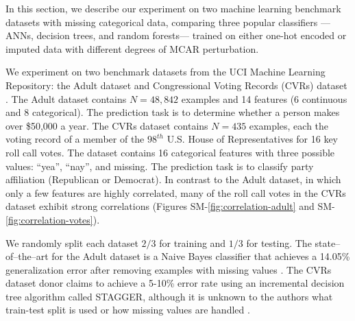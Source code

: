 \documentclass[10pt]{book}
\theoremstyle{definition}
\begin{document}
\par


\setcounter{chapter}{3}
\setcounter{equation}{0} %

In this section, we describe our experiment on two machine learning benchmark datasets with missing categorical data, comparing three popular classifiers --- ANNs, decision trees, and random forests--- trained on either one-hot encoded or imputed data with different degrees of MCAR perturbation.

\par
{}

We experiment on two benchmark datasets from the UCI Machine Learning Repository: the Adult dataset and Congressional Voting Records (CVRs) dataset \citep{Lichman2013}. The Adult dataset contains $N=48,842$ examples and 14 features (6 continuous and 8 categorical). The prediction task is to determine whether a person makes over \$50,000 a year. The CVRs dataset contains $N=435$ examples, each the voting record of a member of the $98^{th}$ U.S. House of Representatives for 16 key roll call votes. The dataset contains 16 categorical features with three possible values: ``yea'', ``nay'', and missing. The prediction task is to classify party affiliation (Republican or Democrat). In contrast to the Adult dataset, in which only a few features are highly correlated, many of the roll call votes in the CVRs dataset exhibit strong correlations (Figures SM-\ref{fig:correlation-adult} and SM-\ref{fig:correlation-votes}).

We randomly split each dataset $2/3$ for training and $1/3$ for testing. The state--of--the--art for the Adult dataset is a Naive Bayes classifier that achieves a 14.05\% generalization error after removing examples with missing values \citep{kohavi1996}. The CVRs dataset donor claims to achieve a 5-10\% error rate using an incremental decision tree algorithm called STAGGER, although it is unknown to the authors what train-test split is used or how missing values are handled \citep{schlimmer1987,schlimmer1986}.

\par
{}
\end{document}
